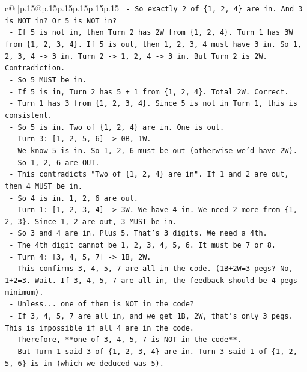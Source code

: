 \documentclass{article}
\begin{document}
{\begin{supertabular}{c@{$\;$}|p{.15\linewidth}@{}p{.15\linewidth}p{.15\linewidth}p{.15\linewidth}p{.15\linewidth}p{.15\linewidth}}
{{{\texttt{    {-} So exactly 2 of \{1, 2, 4\} are in. And 3 is NOT in? Or 5 is NOT in?} \\
\texttt{    {-} If 5 is not in, then Turn 2 has 2W from \{1, 2, 4\}. Turn 1 has 3W from \{1, 2, 3, 4\}. If 5 is out, then 1, 2, 3, 4 must have 3 in. So 1, 2, 3, 4 {-}> 3 in. Turn 2 {-}> 1, 2, 4 {-}> 3 in. But Turn 2 is 2W. Contradiction.} \\
\texttt{    {-} So 5 MUST be in.} \\
\texttt{    {-} If 5 is in, Turn 2 has 5 + 1 from \{1, 2, 4\}. Total 2W. Correct.} \\
\texttt{    {-} Turn 1 has 3 from \{1, 2, 3, 4\}. Since 5 is not in Turn 1, this is consistent.} \\
\texttt{    {-} So 5 is in. Two of \{1, 2, 4\} are in. One is out.} \\
\texttt{    {-} Turn 3: {[}1, 2, 5, 6{]} {-}> 0B, 1W.} \\
\texttt{      {-} We know 5 is in. So 1, 2, 6 must be out (otherwise we'd have 2W).} \\
\texttt{      {-} So 1, 2, 6 are OUT.} \\
\texttt{      {-} This contradicts "Two of \{1, 2, 4\} are in". If 1 and 2 are out, then 4 MUST be in.} \\
\texttt{      {-} So 4 is in. 1, 2, 6 are out.} \\
\texttt{      {-} Turn 1: {[}1, 2, 3, 4{]} {-}> 3W. We have 4 in. We need 2 more from \{1, 2, 3\}. Since 1, 2 are out, 3 MUST be in.} \\
\texttt{      {-} So 3 and 4 are in. Plus 5. That's 3 digits. We need a 4th.} \\
\texttt{      {-} The 4th digit cannot be 1, 2, 3, 4, 5, 6. It must be 7 or 8.} \\
\texttt{      {-} Turn 4: {[}3, 4, 5, 7{]} {-}> 1B, 2W.} \\
\texttt{        {-} This confirms 3, 4, 5, 7 are all in the code. (1B+2W=3 pegs? No, 1+2=3. Wait. If 3, 4, 5, 7 are all in, the feedback should be 4 pegs minimum).} \\
\texttt{        {-} Unless... one of them is NOT in the code?} \\
\texttt{        {-} If 3, 4, 5, 7 are all in, and we get 1B, 2W, that's only 3 pegs. This is impossible if all 4 are in the code.} \\
\texttt{        {-} Therefore, **one of 3, 4, 5, 7 is NOT in the code**.} \\
\texttt{        {-} But Turn 1 said 3 of \{1, 2, 3, 4\} are in. Turn 3 said 1 of \{1, 2, 5, 6\} is in (which we deduced was 5).} \\
}}}
\end{supertabular}}
\end{document}
